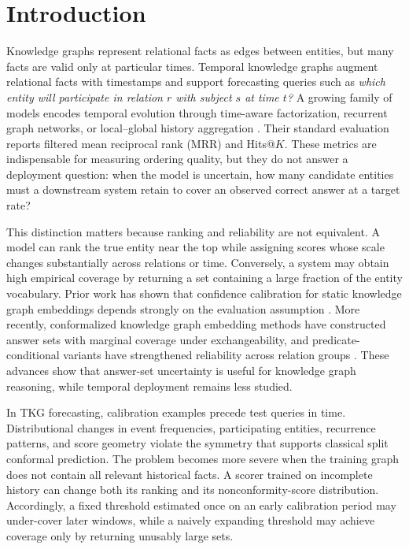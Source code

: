 \documentclass[information,article,submit,oneauthor,pdftex]{Definitions/mdpi}
\begin{document}
\section{Introduction}
\label{sec:introduction}

Knowledge graphs represent relational facts as edges between entities, but many
facts are valid only at particular times. Temporal knowledge graphs augment
relational facts with timestamps and support forecasting queries such as
\emph{which entity will participate in relation \(r\) with subject \(s\) at
time \(t\)?} A growing family of models encodes temporal evolution through
time-aware factorization, recurrent graph networks, or local--global history
aggregation \cite{garciaduran2018sequence,li2021regcn,li2022tirgn,cai2023survey}.
Their standard evaluation reports filtered mean reciprocal rank (MRR) and
Hits@\(K\). These metrics are indispensable for measuring ordering quality, but
they do not answer a deployment question: when the model is uncertain, how many
candidate entities must a downstream system retain to cover an observed correct
answer at a target rate?

This distinction matters because ranking and reliability are not equivalent.
A model can rank the true entity near the top while assigning scores whose scale
changes substantially across relations or time. Conversely, a system may obtain
high empirical coverage by returning a set containing a large fraction of the
entity vocabulary. Prior work has shown that confidence calibration for static
knowledge graph embeddings depends strongly on the evaluation assumption
\cite{safavi2020calibration}. More recently, conformalized knowledge graph
embedding methods have constructed answer sets with marginal coverage under
exchangeability, and predicate-conditional variants have strengthened
reliability across relation groups \cite{zhu2025kgcp,zhu2025condkgcp}. These
advances show that answer-set uncertainty is useful for knowledge graph
reasoning, while temporal deployment remains less studied.

In TKG forecasting, calibration examples precede test queries in time.
Distributional changes in event frequencies, participating entities, recurrence
patterns, and score geometry violate the symmetry that supports classical split
conformal prediction. The problem becomes more severe when the training graph
does not contain all relevant historical facts. A scorer trained on incomplete
history can change both its ranking and its nonconformity-score distribution.
Accordingly, a fixed threshold estimated once on an early calibration period may
under-cover later windows, while a naively expanding threshold may achieve
coverage only by returning unusably large sets.
\end{document}
